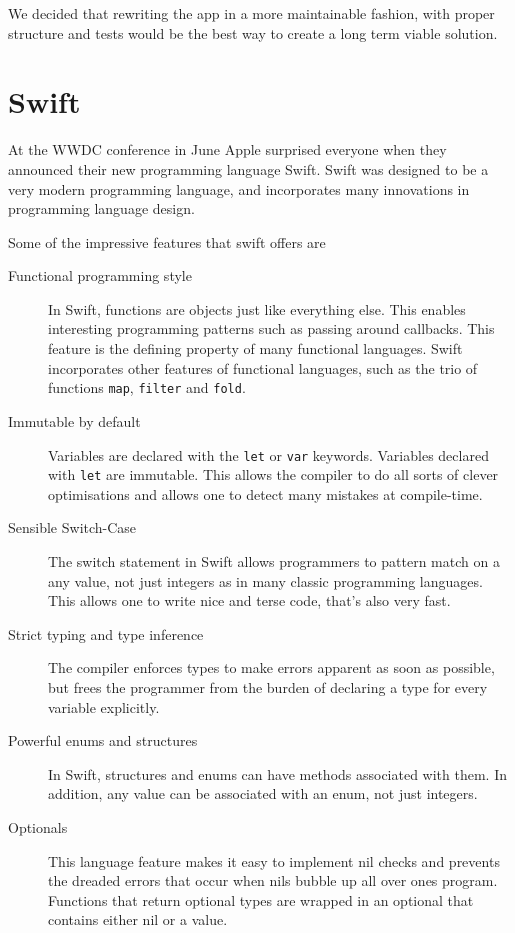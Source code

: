 \documentclass[pdftex, DIV=calc, paper=a4, fontsize=11pt]{scrartcl}	 %
\begin{document}
We decided that rewriting the app in a more maintainable fashion, with proper structure and tests
would be the best way to create a long term viable solution.

\section{Swift}
\label{sec:swift}

At the WWDC\cite{wwdc} conference in June Apple surprised everyone when they announced their new programming
language Swift. Swift was designed to be a very modern programming language, and incorporates
many innovations in programming language design.

Some of the impressive features that swift offers are
\begin{description}
    \item[Functional programming style] In Swift, functions are objects just like everything else.
        This enables interesting programming patterns such as passing around callbacks. This feature
        is the defining property of many functional languages. Swift incorporates other features 
        of functional languages, such as the trio of functions \texttt{map}, \texttt{filter} and \texttt{fold}.
    \item[Immutable by default] Variables are declared with the \texttt{let} or \texttt{var}
        keywords. Variables declared with \texttt{let} are immutable. This allows the compiler to
        do all sorts of clever optimisations and allows one to detect many mistakes at compile-time.
    \item[Sensible Switch-Case] The switch statement in Swift allows programmers to pattern match on
        a any value, not just integers as in many classic programming languages. This allows one 
        to write nice and terse code, that's also very fast.
    \item[Strict typing and type inference] The compiler enforces types to make errors apparent as
        soon as possible, but frees the programmer from the burden of declaring a type for every
        variable explicitly.
    \item[Powerful enums and structures] In Swift, structures and enums can have methods associated with them. In addition, any value can be associated with an enum, not just integers.
    \item[Optionals] This language feature makes it easy to implement nil checks and prevents the 
        dreaded errors that occur when nils bubble up all over ones program. Functions that return 
        optional types are wrapped in an optional that contains either nil or a value. 
\end{description}
\end{document}
